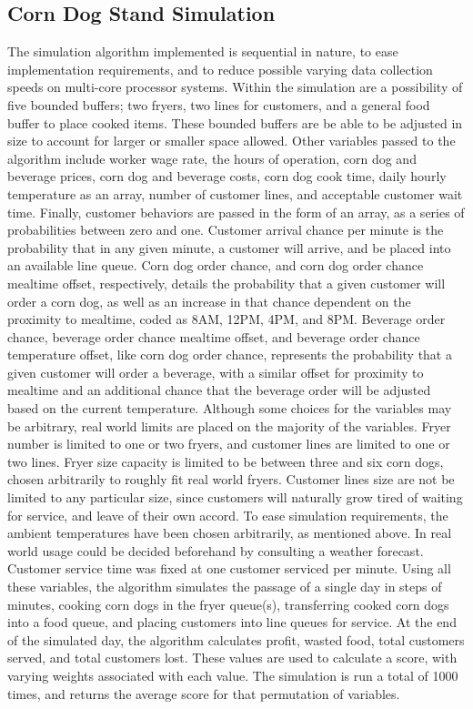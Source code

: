 \documentclass[10pt, twocolumn]{article}
\begin{document}
\subsection{Corn Dog Stand Simulation}
The simulation algorithm implemented is sequential in nature, to ease implementation
requirements, and to reduce possible varying data collection speeds on multi-core processor systems.
Within the simulation are a possibility of five bounded buffers;
two fryers, two lines for customers, and a general food buffer to place cooked items.
These bounded buffers are be able to be adjusted in size to account for larger or
smaller space allowed. Other variables passed to the algorithm include worker wage rate,
the hours of operation, corn dog and beverage prices, corn dog and beverage costs,
corn dog cook time, daily hourly temperature as an array, number of customer lines, and
acceptable customer wait time. Finally, customer behaviors are passed in the form
of an array, as a series of probabilities between zero and one. Customer arrival
chance per minute is the probability that in any given minute, a customer will arrive,
and be placed into an available line queue.  Corn dog order chance, and corn dog order
chance mealtime offset, respectively, details the probability that a given customer will order a corn dog,
as well as an increase in that chance dependent on the proximity to mealtime,
coded as 8AM, 12PM, 4PM, and 8PM. Beverage order chance, beverage order chance mealtime offset,
and beverage order chance temperature offset, like corn dog order chance, represents
the probability that a given customer will order a beverage, with a similar offset for
proximity to mealtime and an additional chance that the beverage order will be adjusted based on
the current temperature.
\bigbreak
Although some choices for the variables may be arbitrary, real world limits are placed
on the majority of the variables. Fryer number is limited to one or two fryers, and customer
lines are limited to one or two lines. Fryer size capacity is limited to be between
three and six corn dogs, chosen arbitrarily to roughly fit real world fryers. Customer lines size are
not be limited to any particular size, since customers will naturally
grow tired of waiting for service, and leave of their own accord. To ease simulation requirements,
the ambient temperatures have been chosen arbitrarily, as mentioned above. In real world usage
could be decided beforehand by consulting a weather forecast. Customer service time was
fixed at one customer serviced per minute.
\bigbreak
Using all these variables, the algorithm simulates the passage of a single day in
steps of minutes, cooking corn dogs in the fryer queue(s), transferring cooked corn dogs
into a food queue, and placing customers into line queues for service. At the end of the simulated
day, the algorithm calculates profit, wasted food, total customers served, and total customers lost.
These values are used to calculate a score, with varying weights associated with each value.
The simulation is run a total of 1000 times, and returns the average score
for that permutation of variables.
\end{document}
